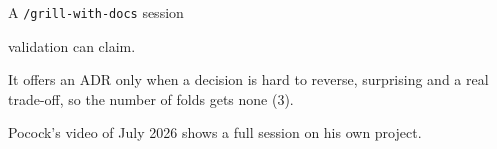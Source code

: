 \begin{frame}[fragile,source={Pocock (2026), mattpocock/skills v1.3.1: grill-with-docs, grilling, domain-modeling · video of 16 Jul 2026}]{A \texttt{/grill-with-docs} session}
{      validation can claim.\par
    It offers an ADR only when a decision is hard to reverse, surprising and a real trade-off,
      so the number of folds gets none (3).\par
    Pocock's video of July 2026 shows a full session on his own project.}
\end{frame}

\newcommand\stagefile[5]{%
  \node[anchor=north west,inner xsep=1mm,inner ysep=0.7mm,text height=1.9mm,text depth=0.5mm,
    font=\ttfamily\fontsize{7}{8}\selectfont,text=udsdark] (#1t) at (#2-12.2,#3)
    {\textcolor{udsblue}{\faIcon[regular]{file-alt}}\enspace#4};
  \node[anchor=north,minimum width=24.4mm,text width=22mm,inner xsep=1.2mm,inner ysep=1.3mm,
    align=left,font=\ttfamily\fontsize{7}{8.4}\selectfont,text=udsdark] (#1) at (#2,#3-4.2) {#5};
  \begin{scope}
    \clip[rounded corners=1mm] (#2-12.2,#3) rectangle ($(#1.south)+(12.2,0)$);
    \fill[darktint] (#1t.north east) rectangle (#2+12.2,#3-4.2);
    \draw[udsblue,line width=1.4pt] (#1t.north west) -- (#1t.north east);
  \end{scope}
  \draw[udsgreylight,line width=0.5pt,rounded corners=1mm] (#2-12.2,#3) rectangle ($(#1.south)+(12.2,0)$);}
